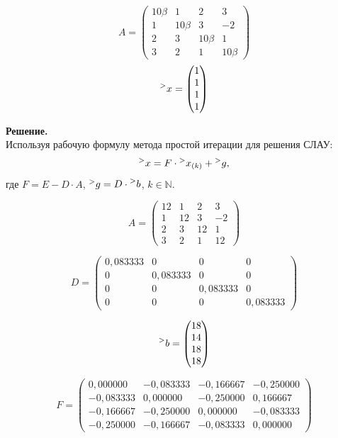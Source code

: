 \documentclass[14pt,a4paper]{scrartcl}
\begin{document}
$$ A =
\begin{pmatrix}
	10\beta & 1  & 2  & 3  \\
	1  & 10\beta & 3  & -2 \\
	2  & 3  & 10\beta & 1  \\
	3  & 2  & 1  & 10\beta
\end{pmatrix}
$$
$$
\prescript{>}{}{x} = 
\begin{pmatrix}
	1 \\
	1 \\
	1 \\
	1
\end{pmatrix}
$$


\textbf{Решение.}\\
Используя рабочую формулу метода простой итерации для решения СЛАУ:
\begin{equation*}
	\prescript{>}{}{x} = F \cdot \prescript{>}{}{x_{(k)}} + \prescript{>}{}{g},
\end{equation*}
где $F = E - D\cdot A$, $\prescript{>}{}{g} = D \cdot \prescript{>}{}{b}$, $k \in \mathbb{N}$.


$$ A =
\begin{pmatrix}
12 & 1  & 2  & 3  \\
1  & 12 & 3  & -2 \\
2  & 3  & 12 & 1  \\
3  & 2  & 1  & 12
\end{pmatrix}
$$

$$ D =
\begin{pmatrix}
0,083333 & 0        & 0        & 0        \\
0        & 0,083333 & 0        & 0        \\
0        & 0        & 0,083333 & 0        \\
0        & 0        & 0        & 0,083333
\end{pmatrix}
$$

$$
\prescript{>}{}{b} = 
\begin{pmatrix}
18 \\
14 \\
18 \\
18
\end{pmatrix}
$$

$$ F =
\begin{pmatrix}
0,000000  & -0,083333 & -0,166667 & -0,250000 \\
-0,083333 & 0,000000  & -0,250000 & 0,166667  \\
-0,166667 & -0,250000 & 0,000000  & -0,083333 \\
-0,250000 & -0,166667 & -0,083333 & 0,000000 
\end{pmatrix}
$$
\end{document}
